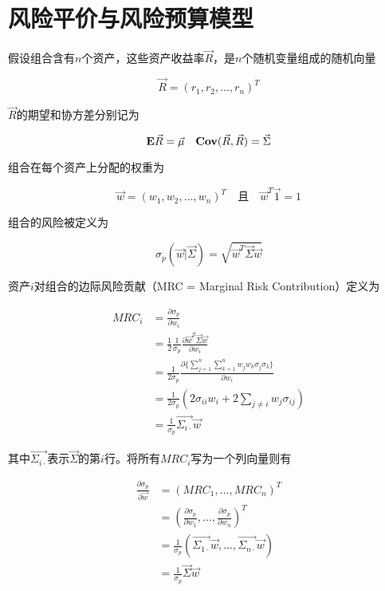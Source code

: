 \section{风险平价与风险预算模型}

假设组合含有$n$个资产，这些资产收益率$\vec{R}$，是$n$个随机变量组成的随机向量

\[
    \vec{R} = (r_1,r_2,...,r_n)^T
\]

$\vec{R}$的期望和协方差分别记为

\[
    \mathbf{E} \vec{R} = \vec{\mu} \quad \mathbf{Cov}(\vec{R}, \vec{R}) = \vec{\Sigma}
\]

组合在每个资产上分配的权重为

\[
    \vec{w} = (w_1,w_2,...,w_n)^T\quad  \text{且}\quad \vec{w}^T\vec{1} =1
\]

组合的风险被定义为

\begin{equation}
    \sigma_p(\vec{w}|\vec{\Sigma}) = \sqrt{\vec{w}^T\vec{\Sigma}\vec{w}}
\end{equation}

资产$i$对组合的边际风险贡献（MRC = Marginal Risk Contribution）定义为

\begin{equation}
    \begin{aligned}
        MRC_i & = \frac{\partial \sigma_p}{\partial w_i}                                                                 \\
              & = \frac{1}{2}\frac{1}{\sigma_p}\frac{\partial\vec{w}^T\vec{\Sigma}\vec{w}}{\partial w_i}                 \\
              & = \frac{1}{2\sigma_p}\frac{\partial \{\sum_{j=1}^{n}\sum_{k=1}^nw_jw_k\sigma_j\sigma_k \}}{\partial w_i} \\
              & = \frac{1}{2\sigma_p}(2\sigma_{ii}w_i + 2\sum_{j\neq i}w_j\sigma_{ij})                                   \\
              & = \frac{1}{\sigma_p}\vec{\Sigma_{i\cdot}}\vec{w}
    \end{aligned}
\end{equation}

其中$\vec{\Sigma_{i\cdot}}$表示$\vec{\Sigma}$的第$i$行。将所有$MRC_i$写为一个列向量则有

\begin{equation}
    \begin{aligned}
        \frac{\partial \sigma_p}{\partial\vec{w}} & =(MRC_1, ..., MRC_n)^T                                                                  \\
                                                  & = (\frac{\partial \sigma_p}{\partial w_1},...,\frac{\partial \sigma_p}{\partial w_n})^T \\
                                                  & =\frac{1}{\sigma_p}(\vec{\Sigma_{1\cdot}}\vec{w},...,\vec{\Sigma_{n\cdot}}\vec{w})      \\
                                                  & = \frac{1}{\sigma_p}\vec{\Sigma}\vec{w}
    \end{aligned}
\end{equation}

